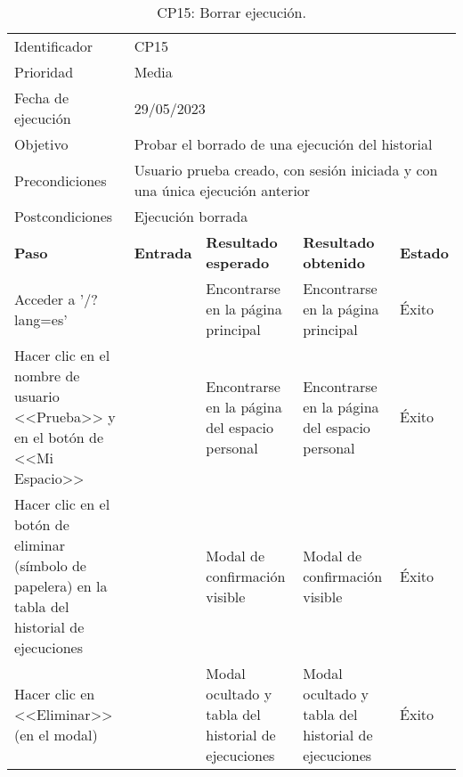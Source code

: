 \begin{table}[H]
\begin{tabular}{p{}p{}p{}p{}p{}}
\rowcolor{gray!25}
Identificador   & \multicolumn{4}{l}{CP15}                                                   \\
Prioridad   & \multicolumn{4}{l}{Media}                                                    \\
\rowcolor{gray!25}
Fecha de ejecución   & \multicolumn{4}{l}{29/05/2023}                                                    \\
Objetivo        & \multicolumn{4}{p{0.80\textwidth}}{Probar el borrado de una ejecución del historial}                                                     \\
\rowcolor{gray!25}
Precondiciones  & \multicolumn{4}{p{0.80\textwidth}}{Usuario prueba creado, con sesión iniciada y con una única ejecución anterior}                                                     \\
Postcondiciones & \multicolumn{4}{l}{Ejecución borrada}                                                     \\ \hline
\rowcolor{gray!25}
\textbf{Paso}   & \textbf{Entrada} & \textbf{Resultado esperado} & \textbf{Resultado obtenido} & \textbf{Estado} \\ \hline
Acceder a '/?lang=es'                                 &                        & Encontrarse en la página principal                                   & Encontrarse en la página principal                           & Éxito  \\ \hline
Hacer clic en el nombre de usuario <<Prueba>> y en el botón de <<Mi Espacio>>  &     & Encontrarse en la página del espacio personal                  & Encontrarse en la página del espacio personal                       & Éxito  \\ \hline 
Hacer clic en el botón de eliminar (símbolo de papelera) en la tabla del historial de ejecuciones &                     & Modal de confirmación visible                                     & Modal de confirmación visible                     & Éxito                            \\ \hline
Hacer clic en <<Eliminar>> (en el modal)              &                        & Modal ocultado y tabla del historial de ejecuciones                    & Modal ocultado y tabla del historial de ejecuciones            & Éxito                            \\ \hline
\end{tabular}
\caption{CP15: Borrar ejecución.}
\end{table}